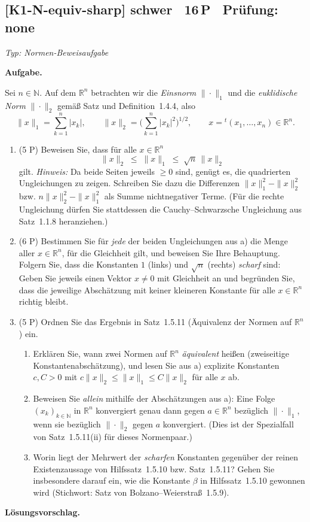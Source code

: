 \documentclass[a4paper,11pt]{article}
\begin{document}
\subsection*{[K1-N-equiv-sharp] \normalfont schwer \textbullet\ 16\,P \textbullet\ Pr\"ufung: none}
\textit{Typ: Normen-Beweisaufgabe}\par\smallskip
\textbf{Aufgabe.}\par
Sei $n\in\mathbb{N}$. Auf dem $\mathbb{R}^n$ betrachten wir die \emph{Einsnorm} $\|\cdot\|_1$ und die \emph{euklidische Norm} $\|\cdot\|_2$ gemäß Satz und Definition~1.4.4, also
\[
\|x\|_1=\sum_{k=1}^n |x_k|,\qquad \|x\|_2=\Big(\sum_{k=1}^n |x_k|^2\Big)^{1/2},\qquad x={}^t(x_1,\dots,x_n)\in\mathbb{R}^n .
\]

\begin{enumerate}[label=\alph*)]
  \item (5 P) Beweisen Sie, dass für alle $x\in\mathbb{R}^n$
  \[
  \|x\|_2\;\le\;\|x\|_1\;\le\;\sqrt{n}\,\|x\|_2
  \]
  gilt. \emph{Hinweis:} Da beide Seiten jeweils $\ge 0$ sind, genügt es, die quadrierten Ungleichungen zu zeigen. Schreiben Sie dazu die Differenzen $\|x\|_1^2-\|x\|_2^2$ bzw. $n\|x\|_2^2-\|x\|_1^2$ als Summe nichtnegativer Terme. (Für die rechte Ungleichung dürfen Sie stattdessen die Cauchy--Schwarzsche Ungleichung aus Satz~1.1.8 heranziehen.)

  \item (6 P) Bestimmen Sie für \emph{jede} der beiden Ungleichungen aus a) die Menge aller $x\in\mathbb{R}^n$, für die Gleichheit gilt, und beweisen Sie Ihre Behauptung. Folgern Sie, dass die Konstanten $1$ (links) und $\sqrt{n}$ (rechts) \emph{scharf} sind: Geben Sie jeweils einen Vektor $x\ne 0$ mit Gleichheit an und begründen Sie, dass die jeweilige Abschätzung mit keiner kleineren Konstante für alle $x\in\mathbb{R}^n$ richtig bleibt.

  \item (5 P) Ordnen Sie das Ergebnis in Satz~1.5.11 (Äquivalenz der Normen auf $\mathbb{R}^n$) ein.
  \begin{enumerate}[label=(\roman*)]
    \item Erklären Sie, wann zwei Normen auf $\mathbb{R}^n$ \emph{äquivalent} heißen (zweiseitige Konstantenabschätzung), und lesen Sie aus a) explizite Konstanten $c,C>0$ mit $c\|x\|_2\le\|x\|_1\le C\|x\|_2$ für alle $x$ ab.
    \item Beweisen Sie \emph{allein} mithilfe der Abschätzungen aus a): Eine Folge $(x_k)_{k\in\mathbb{N}}$ in $\mathbb{R}^n$ konvergiert genau dann gegen $a\in\mathbb{R}^n$ bezüglich $\|\cdot\|_1$, wenn sie bezüglich $\|\cdot\|_2$ gegen $a$ konvergiert. (Dies ist der Spezialfall von Satz~1.5.11(ii) für dieses Normenpaar.)
    \item Worin liegt der Mehrwert der \emph{scharfen} Konstanten gegenüber der reinen Existenzaussage von Hilfssatz~1.5.10 bzw. Satz~1.5.11? Gehen Sie insbesondere darauf ein, wie die Konstante $\beta$ in Hilfssatz~1.5.10 gewonnen wird (Stichwort: Satz von Bolzano--Weierstraß~1.5.9).
  \end{enumerate}
\end{enumerate}\par\smallskip
\textbf{L\"osungsvorschlag.}\par
\end{document}
